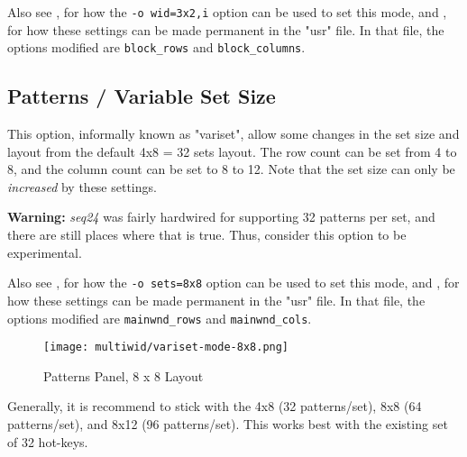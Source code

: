    Also see 
   , for how the
   \texttt{-o wid=3x2,i} option can be used to set this mode, and
   , for
   how these settings can be made permanent in the "usr" file.
   In that file, the options modified are \texttt{block\_rows} and
   \texttt{block\_columns}.

\subsection{Patterns / Variable Set Size}
\label{subsec:seq64_patterns_panel_variset}

   This option, informally known as "variset", allow some changes in
   the set size and layout from the default 4x8 = 32 sets layout.
   The row count can be set from 4 to 8, and the column count can be set to 8
   to 12.  Note that the set size can only be \textsl{increased} by these
   settings.

   \textbf{Warning:}
   \textsl{seq24} was fairly hardwired for supporting 32 patterns per
   set, and there are still places where that is true.  Thus,
   consider this option to be experimental.

   Also see 
   , for how the
   \texttt{-o sets=8x8} option can be used to set this mode, and
   , for
   how these settings can be made permanent in the "usr" file.
   In that file, the options modified are \texttt{mainwnd\_rows} and
   \texttt{mainwnd\_cols}.

\begin{figure}[H]
   \centering 
   \texttt{[image: multiwid/variset-mode-8x8.png]}
   \caption{Patterns Panel, 8 x 8 Layout}
   \label{fig:pattern_window_bottom_panel_variset}
\end{figure}

   Generally, it is recommend to stick with the 4x8 (32 patterns/set),
   8x8 (64 patterns/set), and 8x12 (96 patterns/set).  This works best with the
   existing set of 32 hot-keys.


